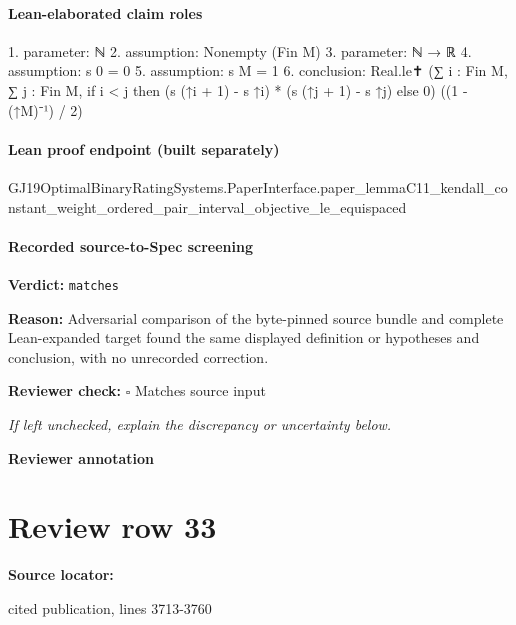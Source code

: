 \documentclass[10pt]{article}
\newcommand{\reviewerbox}{%
  \par\noindent\fbox{\parbox{0.96\linewidth}{\rule{0pt}{0.38in}}}\par
}
\newcommand{\reviewmatch}[1]{%
  \par\noindent\textbf{Reviewer check:} $\square$\; #1\par
  \noindent\emph{If left unchecked, explain the discrepancy or uncertainty below.}\par
}
\begin{document}
\paragraph{Lean-elaborated claim roles}\begin{ReviewVerbatim}
1. parameter: ℕ
2. assumption: Nonempty (Fin M)
3. parameter: ℕ → ℝ
4. assumption: s 0 = 0
5. assumption: s M = 1
6. conclusion: Real.le✝ (∑ i : Fin M, ∑ j : Fin M, if i < j then (s (↑i + 1) - s ↑i) * (s (↑j + 1) - s ↑j) else 0) ((1 - (↑M)⁻¹) / 2)
\end{ReviewVerbatim}

\paragraph{Lean proof endpoint (built separately)}\begin{ReviewVerbatim}
GJ19OptimalBinaryRatingSystems.PaperInterface.paper_lemmaC11_kendall_constant_weight_ordered_pair_interval_objective_le_equispaced
\end{ReviewVerbatim}

\paragraph{Recorded source-to-Spec screening}
\textbf{Verdict:} \texttt{matches}
\\
{\raggedright
\textbf{Reason:} Adversarial comparison of the byte-\allowbreak{}pinned source bundle and complete Lean-\allowbreak{}expanded target found the same displayed definition or hypotheses and conclusion, with no unrecorded correction.\allowbreak{}
\par}
\reviewmatch{Matches source input}
\noindent\textbf{Reviewer annotation}\par
\reviewerbox
\clearpage
\hypertarget{source-claim-9e5abbd5563b8516}{}
\section*{Review row 33}
\textbf{Source locator:} {\footnotesize\raggedright cited publication, lines 3713-\allowbreak{}3760\par}
\end{document}
